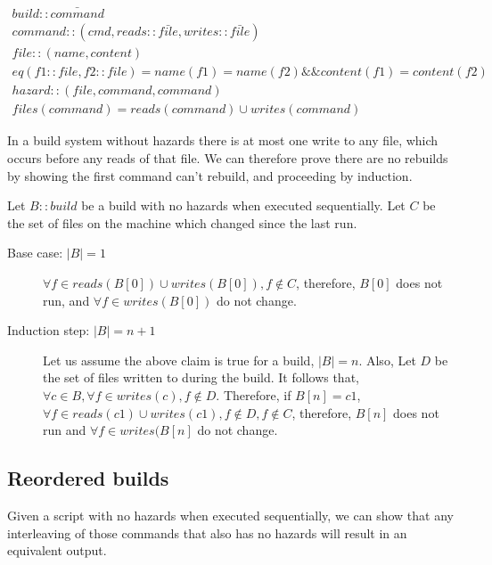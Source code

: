 \begin{align} 
  build :: \bar{command} \\
  command :: (cmd, reads :: \bar{file}, writes:: \bar{file}) \\
  file :: (name, content) \\
  eq(f1 :: file, f2 :: file) = name(f1) = name(f2) \&\& content(f1) = content(f2) \\
  hazard :: (file, command, command) \\
  files(command) = reads(command) \cup writes(command)
\end{align}

In a build system without hazards there is at most one write to any file, which occurs before any reads of that file. We can therefore prove there are no rebuilds by showing the first command can't rebuild, and proceeding by induction.

Let $B :: build$ be a build with no hazards when executed sequentially.  Let $C$ be the set of files on the machine which changed since the last run.

\begin{description}
\item[Base case: $|B| = 1$]

  $\forall f \in reads(B[0]) \cup writes(B[0]), f \notin C$, therefore, $B[0]$ does not run, and $\forall f \in writes(B[0])$ do not change.
  
  
\item[Induction step: $|B| = n+1$]
  Let us assume the above claim is true for a build, $|B| = n$.  Also, Let $D$ be the set of files written to during the build.
  It follows that, $\forall c \in B, \forall f \in writes(c), f \notin D$.
  Therefore, if $B[n] = c1$, $\forall f \in reads(c1) \cup writes(c1), f \notin D, f \notin C$, therefore, $B[n]$ does not run and $\forall f \in writes(B[n]$ do not change.
  
\end{description}

\subsection{Reordered builds}
\label{sec:proof:reorder}

Given a script with no hazards when executed sequentially, we can show that any interleaving of those commands that also has no hazards will result in an equivalent output.

